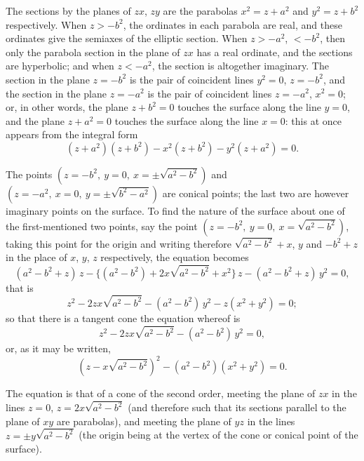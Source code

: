 \documentclass[11pt,a4paper]{article}
\theoremstyle{plain}
\begin{document}
The sections by the planes of $zx$, $zy$ are the parabolas $x^2 = z + a^2$ and $y^2 = z + b^2$ respectively. When $z > -b^2$, the ordinates in each parabola are real, and these ordinates give the semiaxes of the elliptic section. When $z > -a^2$, $< -b^2$, then only the parabola section in the plane of $zx$ has a real ordinate, and the sections are hyperbolic; and when $z < -a^2$, the section is altogether imaginary. The section in the plane $z = -b^2$ is the pair of coincident lines $y^2 = 0$, $z = -b^2$, and the section in the plane $z = -a^2$ is the pair of coincident lines $z = -a^2$, $x^2 = 0$; or, in other words, the plane $z + b^2 = 0$ touches the surface along the line $y = 0$, and the plane $z + a^2 = 0$ touches the surface along the line $x = 0$: this at once appears from the integral form
\[
(z + a^2)(z + b^2) - x^2(z + b^2) - y^2(z + a^2) = 0.
\]

The points $(z = -b^2,\ y = 0,\ x = \pm\sqrt{a^2 - b^2})$ and $(z = -a^2,\ x = 0,\ y = \pm\sqrt{b^2 - a^2})$ are conical points; the last two are however imaginary points on the surface. To find the nature of the surface about one of the first-mentioned two points, say the point $(z = -b^2,\ y = 0,\ x = \sqrt{a^2 - b^2})$, taking this point for the origin and writing therefore $\sqrt{a^2 - b^2} + x$, $y$ and $-b^2 + z$ in the place of $x$, $y$, $z$ respectively, the equation becomes
\[
(a^2 - b^2 + z)\,z - \bigl\{(a^2 - b^2) + 2x\sqrt{a^2 - b^2} + x^2\bigr\}\,z - (a^2 - b^2 + z)\,y^2 = 0,
\]
that is
\[
z^2 - 2zx\sqrt{a^2 - b^2} - (a^2 - b^2)\,y^2 - z(x^2 + y^2) = 0;
\]
so that there is a tangent cone the equation whereof is
\[
z^2 - 2zx\sqrt{a^2 - b^2} - (a^2 - b^2)\,y^2 = 0,
\]
or, as it may be written,
\[
(z - x\sqrt{a^2 - b^2})^2 - (a^2 - b^2)(x^2 + y^2) = 0.
\]

\newpage
The equation is that of a cone of the second order, meeting the plane of $zx$ in the lines $z = 0$, $z = 2x\sqrt{a^2 - b^2}$ (and therefore such that its sections parallel to the plane of $xy$ are parabolas), and meeting the plane of $yz$ in the lines $z = \pm y\sqrt{a^2 - b^2}$ (the origin being at the vertex of the cone or conical point of the surface).
\end{document}
